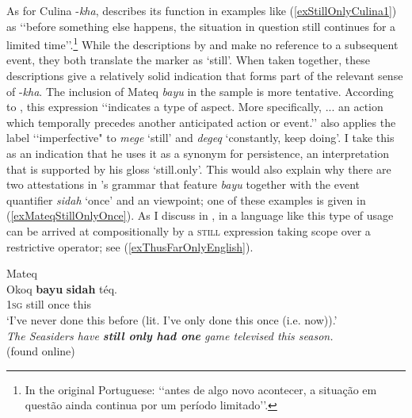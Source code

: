 As for Culina \mbox{-\textit{kha}}, \textcite[183]{Tiss2004} describes its function in examples like (\ref{exStillOnlyCulina1}) as \lq\lq before something else happens, the situation in question still continues for a limited time\rq\rq{}.\footnote{In the original Portuguese: \lq\lq antes de algo novo acontecer, a situação em questão ainda continua por um período limitado\rq\rq{}.} While the descriptions by \textcite{Boyer2020} and \textcite[126]{Dienst2014} make no reference to a subsequent event, they both translate the marker as \lq still\rq{}.
When taken together, these descriptions give a relatively solid indication that  forms part of the relevant sense of \mbox{-\textit{kha}}. The inclusion of Mateq \textit{bayu} in the sample is more tentative. According to \textcite[137]{Connell2013}, this expression \lq\lq indicates a type of  aspect. More specifically, ... an action which temporally precedes another anticipated action or event.\rq\rq{} \textcite{Connell2013} also applies the label \lq\lq imperfective" to \textit{mege} \lq still' and \textit{degeq} \lq constantly, keep doing'. I take this as an indication that he uses it as a synonym for persistence, an interpretation that is supported by his gloss \lq still.only'. This would also explain why there are two attestations in \citeauthor{Connell2013}'s grammar that feature \textit{bayu} together with the event quantifier \textit{sidah} \lq once' and an  viewpoint; one of these examples is given in (\ref{exMateqStillOnlyOnce}). As I discuss in , in a language like  this type of usage can be arrived at compositionally by a \textsc{still} expression taking scope over a restrictive operator; see (\ref{exThusFarOnlyEnglish}).

\begin{exe}
	\ex Mateq\label{exMateqStillOnlyOnce}\\
	\gll Okoq \textbf{bayu} \textbf{sidah} téq.\\
	1\textsc{sg} still once this\\
	\glt \lq I've never done this before (lit. I've only done this once (i.e. now)).'  \parencite[150]{Connell2013}
	\ex {}\label{exThusFarOnlyEnglish}\\
	
	\textit{The Seasiders have \textbf{still only had one} game televised this season.}
	\\(found online)%
\end{exe}

